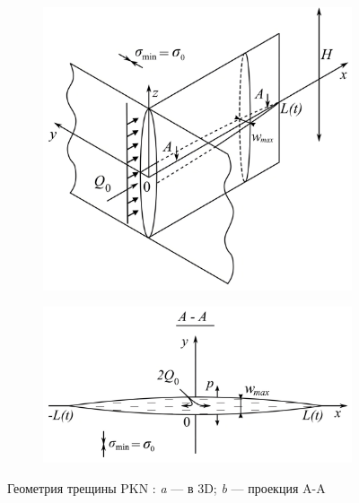 \begin{figure}[H]
	\begin{subfigure}[t]{\dimexpr.5\linewidth-1.3em\relax}
		\centering
		\includegraphics[width=.95\linewidth,valign=t]{images/pkn_model_3D.jpg}
	\end{subfigure}
\hfill %
	\begin{subfigure}[t]{\dimexpr.5\linewidth-1.3em\relax}
		\centering
		\includegraphics[width=.95\linewidth,valign=t]{images/pkn_model_A-A_plane.jpg}
	\end{subfigure}
\captionsetup{justification=centering} %
\caption{Геометрия трещины PKN \cite{esipov}: {\itshape a} --- в 3D; {\itshape b} --- проекция A-A} 
\label{fig:pkn-model}
\end{figure}

